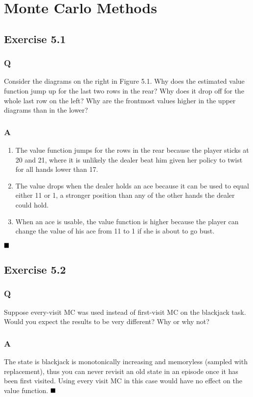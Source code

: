 \section{Monte Carlo Methods}

\subsection{Exercise 5.1}
\subsubsection{Q}
Consider the diagrams on the right in Figure 5.1. Why does the estimated value function jump up for the last two rows in the rear? Why does it drop off for the whole last row on the left? Why are the frontmost values higher in the upper diagrams than in the lower?
\subsubsection{A}
\begin{enumerate}
	\item The value function jumps for the rows in the rear because the player sticks at 20 and 21, where it is unlikely the dealer beat him given her policy to twist for all hands lower than 17.
	\item The value drops when the dealer holds an ace because it can be used to equal either 11 or 1, a stronger position than any of the other hands the dealer could hold.
	\item When an ace is usable, the value function is higher because the player can change the value of his ace from 11 to 1 if she is about to go bust.
\end{enumerate}
$
\hfill \blacksquare
$

\subsection{Exercise 5.2}
\subsubsection{Q}
Suppose every-visit MC was used instead of first-visit MC on the blackjack task. Would you expect the results to be very different? Why or why not?
\subsubsection{A}
The state is blackjack is monotonically increasing and memoryless (sampled with replacement), thus you can never revisit an old state in an episode once it has been first visited. Using every visit MC in this case would have no effect on the value function.
$
\hfill \blacksquare
$

